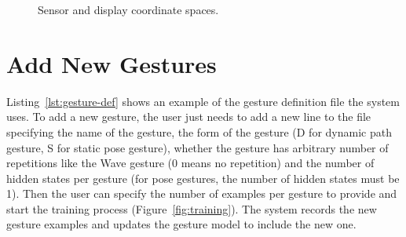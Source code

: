\begin{figure}[tbh]
\centering
{}
\caption{Sensor and display coordinate spaces.}\label{fig:coordinate}
\end{figure}

\section{Add New Gestures}
Listing~\ref{lst:gesture-def} shows an example of the gesture definition file
the system uses. To add a new gesture, the user just needs to add a new line to
the file specifying the name of the gesture, the form of the gesture (D for
dynamic path gesture, S for static pose gesture), whether the gesture has
arbitrary number of repetitions like the Wave gesture (0 means no repetition)
and the number of hidden states per gesture (for pose gestures, the number of hidden states must be 1).
Then the user can specify the number of examples per gesture to provide and
start the training process (Figure~\ref{fig:training}).
The system records the new gesture examples and updates the gesture model to
include the new one.

